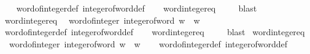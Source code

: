 \begin{isabellebody}
\ \ %
\endisadelimproof
%
\isatagproof
{}\isamarkupfalse%
\ word{}{}{\isacharunderscore}{\kern0pt}of{\isacharunderscore}{\kern0pt}integer{\isacharunderscore}{\kern0pt}def\ integer{\isacharunderscore}{\kern0pt}of{\isacharunderscore}{\kern0pt}word{}{}{\isacharunderscore}{\kern0pt}def\isanewline
\ \ \isamarkupfalse%
\ word{\isacharunderscore}{\kern0pt}integer{\isacharunderscore}{\kern0pt}eq\ \isanewline
\ \ \isamarkupfalse%
\ blast%
\endisatagproof
{\isafoldproof}%
%
\isadelimproof
\isanewline
%
\endisadelimproof
\isanewline
{}\isamarkupfalse%
\ word{}{}{\isacharunderscore}{\kern0pt}integer{\isacharunderscore}{\kern0pt}eq{\isacharcolon}{\kern0pt}\isanewline
\ \ {\isachardoublequoteopen}word{}{}{\isacharunderscore}{\kern0pt}of{\isacharunderscore}{\kern0pt}integer\ {\isacharparenleft}{\kern0pt}integer{\isacharunderscore}{\kern0pt}of{\isacharunderscore}{\kern0pt}word{}{}\ w{\isacharparenright}{\kern0pt}\ {\isacharequal}{\kern0pt}\ w{\isachardoublequoteclose}\ \isanewline
%
\isadelimproof
\ \ %
\endisadelimproof
%
\isatagproof
{}\isamarkupfalse%
\ word{}{}{\isacharunderscore}{\kern0pt}of{\isacharunderscore}{\kern0pt}integer{\isacharunderscore}{\kern0pt}def\ integer{\isacharunderscore}{\kern0pt}of{\isacharunderscore}{\kern0pt}word{}{}{\isacharunderscore}{\kern0pt}def\isanewline
\ \ \isamarkupfalse%
\ word{\isacharunderscore}{\kern0pt}integer{\isacharunderscore}{\kern0pt}eq\ \isanewline
\ \ \isamarkupfalse%
\ blast%
\endisatagproof
{\isafoldproof}%
%
\isadelimproof
\isanewline
%
\endisadelimproof
\isanewline
{}\isamarkupfalse%
\ word{}{}{\isacharunderscore}{\kern0pt}integer{\isacharunderscore}{\kern0pt}eq{\isacharcolon}{\kern0pt}\isanewline
\ \ {\isachardoublequoteopen}word{}{}{\isacharunderscore}{\kern0pt}of{\isacharunderscore}{\kern0pt}integer\ {\isacharparenleft}{\kern0pt}integer{\isacharunderscore}{\kern0pt}of{\isacharunderscore}{\kern0pt}word{}{}\ w{\isacharparenright}{\kern0pt}\ {\isacharequal}{\kern0pt}\ w{\isachardoublequoteclose}\isanewline
%
\isadelimproof
\ \ %
\endisadelimproof
%
\isatagproof
{}\isamarkupfalse%
\ word{}{}{\isacharunderscore}{\kern0pt}of{\isacharunderscore}{\kern0pt}integer{\isacharunderscore}{\kern0pt}def\ integer{\isacharunderscore}{\kern0pt}of{\isacharunderscore}{\kern0pt}word{}{}{\isacharunderscore}{\kern0pt}def\isanewline

\end{isabellebody}
